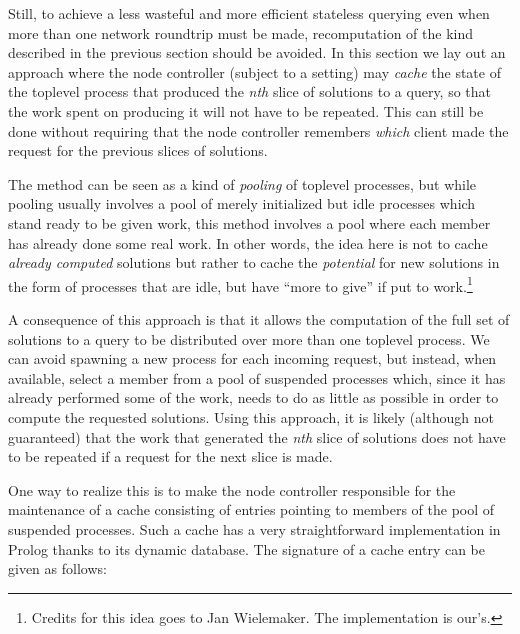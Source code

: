 \noindent Still, to achieve a less wasteful and more efficient stateless querying even when more than one network roundtrip must be made, recomputation of the kind described in the previous section should be avoided. In this section we lay out an approach where the node controller (subject to a setting) may \textit{cache} the state of the toplevel process that produced the \textit{nth} slice of solutions to a query, so that the work spent on producing it will not have to be repeated. This can still be done without requiring that the node controller remembers \emph{which} client made the request for the previous slices of solutions. 


The method can be seen as a kind of \emph{pooling} of toplevel processes, but
while pooling usually involves a pool of merely initialized but idle processes which stand ready to be given work, this method involves a pool where each member has already done some real work. In other words, the idea here is not to cache \emph{already computed} solutions but rather to cache the \emph{potential} for new solutions in the form of processes that are idle, but
have ``more to give'' if put to work.\footnote{Credits for this idea goes to Jan Wielemaker. The implementation is our's.}

A consequence of this approach is that it allows the computation of the
full set of solutions to a query to be distributed over more than one
toplevel process. We can avoid spawning a new process for each incoming
request, but instead, when available, select a member from a pool of
suspended processes which, since it has already performed some of the
work, needs to do as little as possible in order to compute the
requested solutions. Using this approach, it is likely (although not
guaranteed) that the work that generated the \textit{nth} slice of solutions does not have to be repeated if a request for the next slice is made.


One way to realize this is to make the node controller responsible for the
maintenance of a cache consisting of entries pointing to members of the
pool of suspended processes. Such a cache has a very straightforward implementation in Prolog thanks to its dynamic database. The signature of a cache entry can be given as follows:

